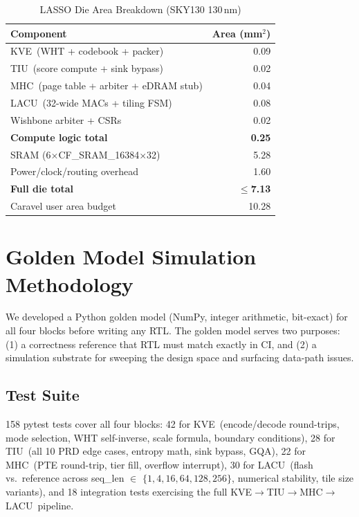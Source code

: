 \documentclass[conference]{IEEEtran}
\newcommand{\kve}{\textsc{KVE}}
\newcommand{\tiu}{\textsc{TIU}}
\newcommand{\mhc}{\textsc{MHC}}
\newcommand{\lacu}{\textsc{LACU}}
\begin{document}
\begin{table}[t]
\caption{LASSO Die Area Breakdown (SKY130 130\,nm)}
\label{tab:area}
\centering
\begin{tabular}{lr}
\toprule
Component & Area (mm$^2$) \\
\midrule
\kve\ (WHT + codebook + packer) & 0.09 \\
\tiu\ (score compute + sink bypass) & 0.02 \\
\mhc\ (page table + arbiter + eDRAM stub) & 0.04 \\
\lacu\ (32-wide MACs + tiling FSM) & 0.08 \\
Wishbone arbiter + CSRs & 0.02 \\
\midrule
\textbf{Compute logic total} & \textbf{0.25} \\
SRAM (6$\times$CF\_SRAM\_16384$\times$32) & 5.28 \\
Power/clock/routing overhead & 1.60 \\
\midrule
\textbf{Full die total} & $\mathbf{\le}$\textbf{7.13} \\
Caravel user area budget & 10.28 \\
\bottomrule
\end{tabular}
\end{table}

\section{Golden Model Simulation Methodology}
\label{sec:methodology}

We developed a Python golden model (NumPy, integer arithmetic,
bit-exact) for all four blocks before writing any RTL. The golden model
serves two purposes: (1) a correctness reference that RTL must match
exactly in CI, and (2) a simulation substrate for sweeping the design
space and surfacing data-path issues.

\subsection{Test Suite}

158 pytest tests cover all four blocks:
42 for \kve\ (encode/decode round-trips, mode selection, WHT
self-inverse, scale formula, boundary conditions),
28 for \tiu\ (all 10 PRD edge cases, entropy math, sink bypass, GQA),
22 for \mhc\ (PTE round-trip, tier fill, overflow interrupt),
30 for \lacu\ (flash vs.\ reference across seq\_len $\in$
$\{1,4,16,64,128,256\}$, numerical stability, tile size variants),
and 18 integration tests exercising the full
\kve$\to$\tiu$\to$\mhc$\to$\lacu\ pipeline.
\end{document}

